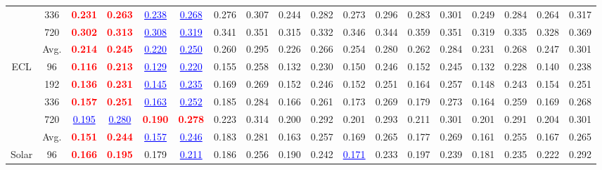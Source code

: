 \documentclass[final,3p,times]{elsarticle}
\begin{document}
\begin{table}[H]
{\begin{tabular}{cc|cc|cc|cc|cc|cc|cc|cc|cc}
 & 336 & \textcolor{red}{\textbf{0.231}} & \textcolor{red}{\textbf{0.263}} & \textcolor{blue}{\underline{0.238}} & \textcolor{blue}{\underline{0.268}} & 0.276 & 0.307 & 0.244 & 0.282 & 0.273 & 0.296 & 0.283 & 0.301 & 0.249 & 0.284 & 0.264 & 0.317 \\
 & 720 & \textcolor{red}{\textbf{0.302}} & \textcolor{red}{\textbf{0.313}} & \textcolor{blue}{\underline{0.308}} & \textcolor{blue}{\underline{0.319}} & 0.341 & 0.351 & 0.315 & 0.332 & 0.346 & 0.344 & 0.359 & 0.351 & 0.319 & 0.335 & 0.328 & 0.369 \\
\cmidrule(lr){2-18}
 & Avg. & \textcolor{red}{\textbf{0.214}} & \textcolor{red}{\textbf{0.245}} & \textcolor{blue}{\underline{0.220}} & \textcolor{blue}{\underline{0.250}} & 0.260 & 0.295 & 0.226 & 0.266 & 0.254 & 0.280 & 0.262 & 0.284 & 0.231 & 0.268 & 0.247 & 0.301 \\
\midrule
\multirow{5}{*}{ECL} & 96 & \textcolor{red}{\textbf{0.116}} & \textcolor{red}{\textbf{0.213}} & \textcolor{blue}{\underline{0.129}} & \textcolor{blue}{\underline{0.220}} & 0.155 & 0.258 & 0.132 & 0.230 & 0.150 & 0.246 & 0.152 & 0.245 & 0.132 & 0.228 & 0.140 & 0.238 \\
 & 192 & \textcolor{red}{\textbf{0.136}} & \textcolor{red}{\textbf{0.231}} & \textcolor{blue}{\underline{0.145}} & \textcolor{blue}{\underline{0.235}} & 0.169 & 0.269 & 0.152 & 0.246 & 0.152 & 0.251 & 0.164 & 0.257 & 0.148 & 0.243 & 0.154 & 0.251 \\
 & 336 & \textcolor{red}{\textbf{0.157}} & \textcolor{red}{\textbf{0.251}} & \textcolor{blue}{\underline{0.163}} & \textcolor{blue}{\underline{0.252}} & 0.185 & 0.284 & 0.166 & 0.261 & 0.173 & 0.269 & 0.179 & 0.273 & 0.164 & 0.259 & 0.169 & 0.268 \\
 & 720 & \textcolor{blue}{\underline{0.195}} & \textcolor{blue}{\underline{0.280}} & \textcolor{red}{\textbf{0.190}} & \textcolor{red}{\textbf{0.278}} & 0.223 & 0.314 & 0.200 & 0.292 & 0.201 & 0.293 & 0.211 & 0.301 & 0.201 & 0.291 & 0.204 & 0.301 \\
\cmidrule(lr){2-18}
 & Avg. & \textcolor{red}{\textbf{0.151}} & \textcolor{red}{\textbf{0.244}} & \textcolor{blue}{\underline{0.157}} & \textcolor{blue}{\underline{0.246}} & 0.183 & 0.281 & 0.163 & 0.257 & 0.169 & 0.265 & 0.177 & 0.269 & 0.161 & 0.255 & 0.167 & 0.265 \\
\midrule
\multirow{5}{*}{Solar} & 96 & \textcolor{red}{\textbf{0.166}} & \textcolor{red}{\textbf{0.195}} & 0.179 & \textcolor{blue}{\underline{0.211}} & 0.186 & 0.256 & 0.190 & 0.242 & \textcolor{blue}{\underline{0.171}} & 0.233 & 0.197 & 0.239 & 0.181 & 0.235 & 0.222 & 0.292 \\

\end{tabular}}
\end{table}
\end{document}
